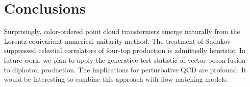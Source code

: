 \section{Conclusions}\label{sec:conclusions}

Surprisingly, color-ordered point cloud transformers emerge naturally
from the Lorentz-equivariant numerical unitarity method. The treatment
of Sudakov-suppressed celestial correlators of four-top production is
admittedly heuristic. In future work, we plan to apply the generative
test statistic of vector boson fusion to diphoton production. The
implications for perturbative QCD are profound. It would be interesting
to combine this approach with flow matching models.


